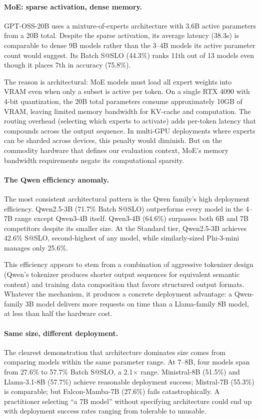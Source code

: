 \documentclass[11pt]{article}
\begin{document}
\paragraph{MoE: sparse activation, dense memory.}
GPT-OSS-20B uses a mixture-of-experts architecture with 3.6B active parameters from a 20B total.  Despite the sparse activation, its average latency (38.3s) is comparable to dense 9B models rather than the 3--4B models its active parameter count would suggest.  Its Batch S@SLO (44.3\%) ranks 11th out of 13 models even though it places 7th in accuracy (75.8\%).

The reason is architectural: MoE models must load all expert weights into VRAM even when only a subset is active per token.  On a single RTX 4090 with 4-bit quantization, the 20B total parameters consume approximately 10GB of VRAM, leaving limited memory bandwidth for KV-cache and computation.  The routing overhead (selecting which experts to activate) adds per-token latency that compounds across the output sequence.  In multi-GPU deployments where experts can be sharded across devices, this penalty would diminish.  But on the commodity hardware that defines our evaluation context, MoE's memory bandwidth requirements negate its computational sparsity.

\paragraph{The Qwen efficiency anomaly.}
The most consistent architectural pattern is the Qwen family's high deployment efficiency.  Qwen2.5-3B (71.7\% Batch S@SLO) outperforms every model in the 4--7B range except Qwen3-4B itself.  Qwen3-4B (64.6\%) surpasses both 6B and 7B competitors despite its smaller size.  At the Standard tier, Qwen2.5-3B achieves 42.6\% S@SLO, second-highest of any model, while similarly-sized Phi-3-mini manages only 25.6\%.

This efficiency appears to stem from a combination of aggressive tokenizer design (Qwen's tokenizer produces shorter output sequences for equivalent semantic content) and training data composition that favors structured output formats.  Whatever the mechanism, it produces a concrete deployment advantage: a Qwen-family 3B model delivers more requests on time than a Llama-family 8B model, at less than half the hardware cost.

\paragraph{Same size, different deployment.}
The clearest demonstration that architecture dominates size comes from comparing models within the same parameter range.  At 7--8B, four models span from 27.6\% to 57.7\% Batch S@SLO, a 2.1$\times$ range.  Ministral-8B (51.5\%) and Llama-3.1-8B (57.7\%) achieve reasonable deployment success; Mistral-7B (55.3\%) is comparable; but Falcon-Mamba-7B (27.6\%) fails catastrophically.  A practitioner selecting ``a 7B model'' without specifying architecture could end up with deployment success rates ranging from tolerable to unusable.
\end{document}
